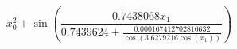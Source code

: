 \documentclass{article}
\begin{document}
\[
x_{0}^{2} + \sin{\left(\frac{0.7438068 x_{1}}{0.7439624 + \frac{0.000167412702816632}{\cos{\left(3.6279216 \cos{\left(x_{1} \right)} \right)}}} \right)}
\]
\end{document}
